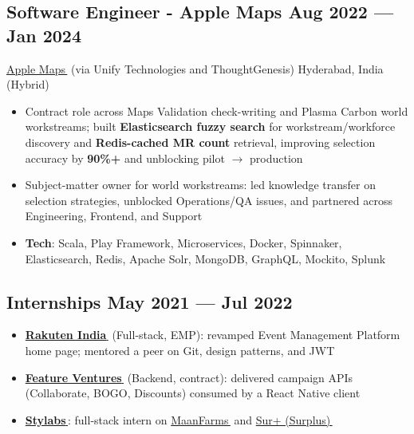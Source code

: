 \documentclass[a4paper,10pt]{article}
\let\orighref\href
\renewcommand{\href}[2]{\orighref{#1}{#2\,\faExternalLink}}
\newcommand{\subtext}[1]{
#1\par\vspace{-0.2cm}}
\newenvironment{zitemize}{
\begin{itemize}\itemsep0pt \parskip0pt \parsep1pt}
{\end{itemize}\vspace{-0.5cm}}
\begin{document}

\subsection*{Software Engineer - Apple Maps \hfill Aug 2022 --- Jan 2024} 
\subtext{\href{https://www.apple.com/in/maps/}{Apple Maps} (via Unify Technologies and ThoughtGenesis) \hfill Hyderabad, India (Hybrid)} 
    \begin{zitemize}
        \item Contract role across Maps Validation check-writing and Plasma Carbon world workstreams; built \textbf{Elasticsearch fuzzy search} for workstream/workforce discovery and \textbf{Redis-cached MR count} retrieval, improving selection accuracy by \textbf{90\%+} and unblocking pilot $\rightarrow$ production
        \item Subject-matter owner for world workstreams: led knowledge transfer on selection strategies, unblocked Operations/QA issues, and partnered across Engineering, Frontend, and Support
        \item \textbf{Tech}: Scala, Play Framework, Microservices, Docker, Spinnaker, Elasticsearch, Redis, Apache Solr, MongoDB, GraphQL, Mockito, Splunk
        \end{zitemize}

\subsection*{Internships \hfill May 2021 --- Jul 2022} 
    \begin{zitemize}
        \item \href{https://corp.rakuten.co.in/}{\textbf{Rakuten India}} (Full-stack, EMP): revamped Event Management Platform home page; mentored a peer on Git, design patterns, and JWT
        \item \href{https://featureventures.com/}{\textbf{Feature Ventures}} (Backend, contract): delivered campaign APIs (Collaborate, BOGO, Discounts) consumed by a React Native client
        \item \href{https://stylabs.in/}{\textbf{Stylabs}}: full-stack intern on \href{https://maanfarms.com/}{MaanFarms} and \href{https://www.surplusapp.in/}{Sur+ (Surplus)}
    \end{zitemize}
\end{document}
